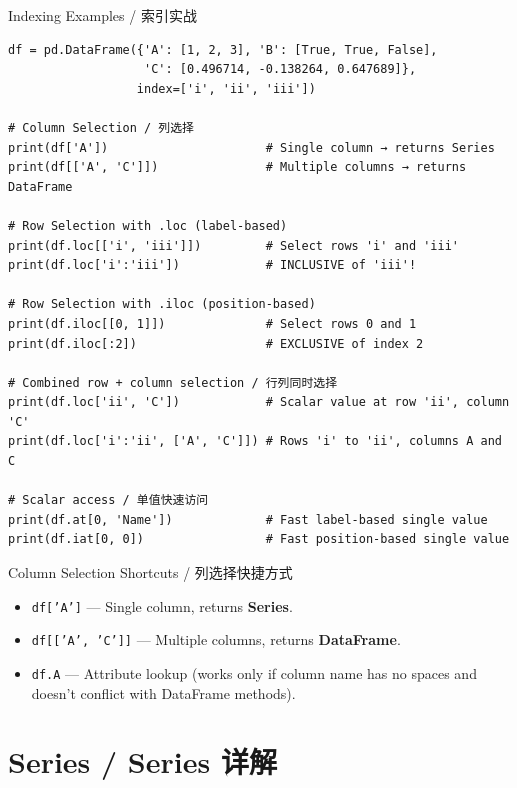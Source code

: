 \documentclass[11pt,a4paper]{report}
\let\oldtexttt\texttt
\renewcommand{\texttt}[1]{\textcolor{mainblue}{\oldtexttt{#1}}}
\begin{document}
\begin{examplebox}{Indexing Examples / 索引实战}
\begin{lstlisting}
df = pd.DataFrame({'A': [1, 2, 3], 'B': [True, True, False],
                   'C': [0.496714, -0.138264, 0.647689]},
                  index=['i', 'ii', 'iii'])

# Column Selection / 列选择
print(df['A'])                      # Single column → returns Series
print(df[['A', 'C']])               # Multiple columns → returns DataFrame

# Row Selection with .loc (label-based)
print(df.loc[['i', 'iii']])         # Select rows 'i' and 'iii'
print(df.loc['i':'iii'])            # INCLUSIVE of 'iii'!

# Row Selection with .iloc (position-based)
print(df.iloc[[0, 1]])              # Select rows 0 and 1
print(df.iloc[:2])                  # EXCLUSIVE of index 2

# Combined row + column selection / 行列同时选择
print(df.loc['ii', 'C'])            # Scalar value at row 'ii', column 'C'
print(df.loc['i':'ii', ['A', 'C']]) # Rows 'i' to 'ii', columns A and C

# Scalar access / 单值快速访问
print(df.at[0, 'Name'])             # Fast label-based single value
print(df.iat[0, 0])                 # Fast position-based single value
\end{lstlisting}
\end{examplebox}

\begin{concept}{Column Selection Shortcuts / 列选择快捷方式}
    \begin{itemize}[itemsep=0.3em]
        \item \texttt{df['A']} — Single column, returns \textbf{Series}.
        \item \texttt{df[['A', 'C']]} — Multiple columns, returns \textbf{DataFrame}.
        \item \texttt{df.A} — Attribute lookup (works only if column name has no spaces and doesn't conflict with DataFrame methods).
    \end{itemize}
\end{concept}

\section{Series / Series 详解}
\end{document}
